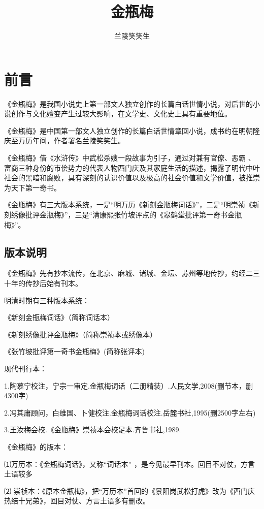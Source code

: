 \documentclass[a4paper,12pt,UTF8,twoside]{ctexbook}
\title{\heiti\zihao{0} 金瓶梅}
\author{兰陵笑笑生}
\date{}
\begin{document}
\maketitle
\tableofcontents

\frontmatter
\chapter{前言}

《金瓶梅》是我国小说史上第一部文人独立创作的长篇白话世情小说，对后世的小说创作与文化嬗变产生过较大影响，在文学史、文化史上具有重要地位。

《金瓶梅》是中国第一部文人独立创作的长篇白话世情章回小说，成书约在明朝隆庆至万历年间，作者署名兰陵笑笑生。

《金瓶梅》借《水浒传》中武松杀嫂一段故事为引子，通过对兼有官僚、恶霸 、富商三种身份的市侩势力的代表人物西门庆及其家庭生活的描述，揭露了明代中叶社会的黑暗和腐败，具有深刻的认识价值以及极高的社会价值和文学价值，被推崇为天下第一奇书。

《金瓶梅》有三大版本系统，一是“明万历《新刻金瓶梅词话》”，二是“明崇祯《新刻绣像批评金瓶梅》”，三是“清康熙张竹坡评点的《皋鹤堂批评第一奇书金瓶梅》”。

\section{版本说明}

《金瓶梅》先有抄本流传，在北京、麻城、诸城、金坛、苏州等地传抄，约经二三十年的传抄后始有刊本。

明清时期有三种版本系统：

《新刻金瓶梅词话》（简称词话本）

《新刻绣像批评金瓶梅》（简称崇祯本或绣像本）

《张竹坡批评第一奇书金瓶梅》(简称张评本)

现代刊行本：

1.陶慕宁校注，宁宗一审定.金瓶梅词话（二册精装）.人民文学,2008(删节本，删4300字)

2.冯其庸顾问，白维国、卜健校注.金瓶梅词话校注.岳麓书社,1995(删2500字左右)

3.王汝梅会校.《金瓶梅》崇祯本会校足本.齐鲁书社,1989.

《金瓶梅》的版本：

⑴万历本：《金瓶梅词话》，又称“词话本” ，是今见最早刊本。回目不对仗，方言土语较多

⑵ 崇祯本：《原本金瓶梅》，把“万历本”首回的《景阳岗武松打虎》改为《西门庆热结十兄弟》，回目对仗、方言土语多有删改。
\end{document}
